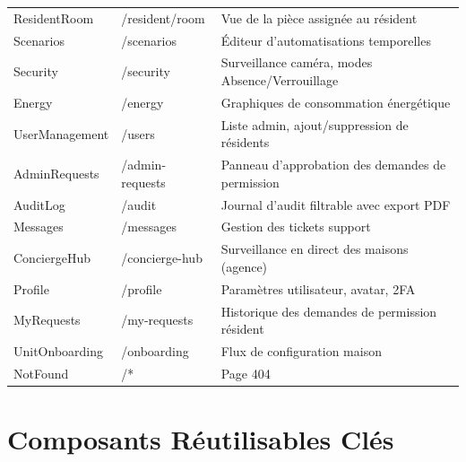 \begin{center}
\begin{longtable}{p{} p{} p{}}
ResidentRoom       & /resident/room   & Vue de la pièce assignée au résident \\
Scenarios          & /scenarios       & Éditeur d'automatisations temporelles \\
Security           & /security        & Surveillance caméra, modes Absence/Verrouillage \\
Energy             & /energy          & Graphiques de consommation énergétique \\
UserManagement     & /users           & Liste admin, ajout/suppression de résidents \\
AdminRequests      & /admin-requests  & Panneau d'approbation des demandes de permission \\
AuditLog           & /audit           & Journal d'audit filtrable avec export PDF \\
Messages           & /messages        & Gestion des tickets support \\
ConciergeHub       & /concierge-hub   & Surveillance en direct des maisons (agence) \\
Profile            & /profile         & Paramètres utilisateur, avatar, 2FA \\
MyRequests         & /my-requests     & Historique des demandes de permission résident \\
UnitOnboarding     & /onboarding      & Flux de configuration maison \\
NotFound           & /*               & Page 404 \\
\end{longtable}
\end{center}

\section{Composants Réutilisables Clés}

